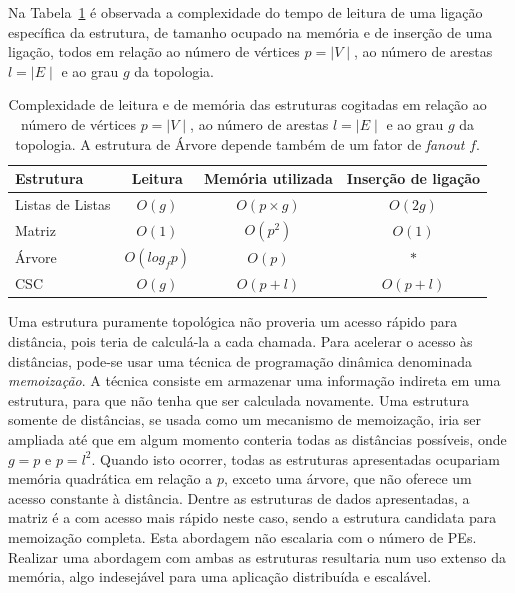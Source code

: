 Na Tabela~\ref{tab:struct_comparison} é observada a complexidade do tempo de leitura de uma ligação específica da estrutura, de tamanho ocupado na memória e de inserção de uma ligação, todos em relação ao número de vértices $p = \mid V \mid$, ao número de arestas $l = \mid E \mid$ e ao grau $g$ da topologia. 

\setlength{\tabcolsep}{0.5em}
\begin{table}[t]
    \centering
    \begin{tabular}{l c c c}
        \toprule
        \textbf{Estrutura} & \textbf{Leitura} &  \textbf{Memória utilizada} & \textbf{Inserção de ligação} \\ \midrule
        Listas de Listas & $O(g)$ & $O(p \times g)$ & $O(2g)$ \\
        Matriz & $O(1)$ & $O(p^2)$ & $O(1)$ \\
        Árvore & $O(log_f p)$ & $O(p)$ & $*$ \\
        CSC &  $O(g)$ & $O(p+l)$ & $O(p + l)$  \\ \bottomrule
    \end{tabular}
    \caption[Complexidade de leitura e de memória das estruturas cogitadas.]{Complexidade de leitura e de memória das estruturas cogitadas em relação ao número de vértices $p = \mid V \mid$, ao número de arestas $l = \mid E \mid$ e ao grau $g$ da topologia. A estrutura de Árvore depende também de um fator de \textit{fanout} $f$. }
    \label{tab:struct_comparison}
\end{table}

Uma estrutura puramente topológica não proveria um acesso rápido para distância, pois teria de calculá-la a cada chamada.
Para acelerar o acesso às distâncias, pode-se usar uma técnica de programação dinâmica denominada \textit{memoização}.
A técnica consiste em armazenar uma informação indireta em uma estrutura, para que não tenha que ser calculada novamente.
Uma estrutura somente de distâncias, se usada como um mecanismo de memoização, iria ser ampliada até que em algum momento conteria todas as distâncias possíveis, onde $g = p$ e $p = l^2$. 
Quando isto ocorrer, todas as estruturas apresentadas ocupariam memória quadrática em relação a $p$, exceto uma árvore, que não oferece um acesso constante à distância.
Dentre as estruturas de dados apresentadas, a matriz é a com acesso mais rápido neste caso, sendo a estrutura candidata para memoização completa.
Esta abordagem não escalaria com o número de PEs. Realizar uma abordagem com ambas as estruturas resultaria num uso extenso da memória, algo indesejável para uma aplicação distribuída e escalável.

